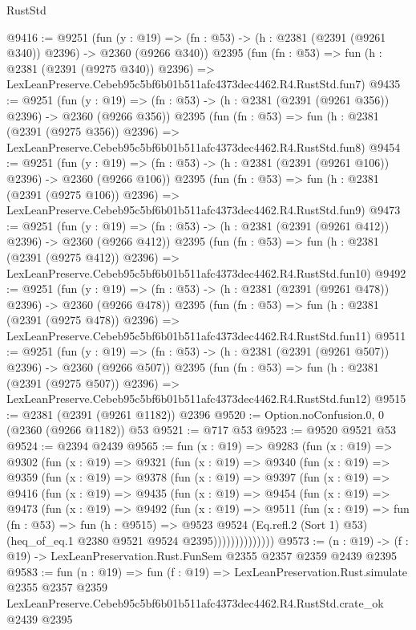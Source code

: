 \begin{lexlean}{RustStd}
\begin{coremodule}
@9416 := @9251
    (fun (y : @19) => (fn : @53) -> (h : @2381 (@2391 (@9261 @340)) @2396) -> @2360 (@9266 @340))
    @2395
    (fun (fn : @53) =>
    fun (h : @2381 (@2391 (@9275 @340)) @2396) =>
    LexLeanPreserve.Cebeb95c5bf6b01b511afc4373dec4462.R4.RustStd.fun7)
@9435 := @9251
    (fun (y : @19) => (fn : @53) -> (h : @2381 (@2391 (@9261 @356)) @2396) -> @2360 (@9266 @356))
    @2395
    (fun (fn : @53) =>
    fun (h : @2381 (@2391 (@9275 @356)) @2396) =>
    LexLeanPreserve.Cebeb95c5bf6b01b511afc4373dec4462.R4.RustStd.fun8)
@9454 := @9251
    (fun (y : @19) => (fn : @53) -> (h : @2381 (@2391 (@9261 @106)) @2396) -> @2360 (@9266 @106))
    @2395
    (fun (fn : @53) =>
    fun (h : @2381 (@2391 (@9275 @106)) @2396) =>
    LexLeanPreserve.Cebeb95c5bf6b01b511afc4373dec4462.R4.RustStd.fun9)
@9473 := @9251
    (fun (y : @19) => (fn : @53) -> (h : @2381 (@2391 (@9261 @412)) @2396) -> @2360 (@9266 @412))
    @2395
    (fun (fn : @53) =>
    fun (h : @2381 (@2391 (@9275 @412)) @2396) =>
    LexLeanPreserve.Cebeb95c5bf6b01b511afc4373dec4462.R4.RustStd.fun10)
@9492 := @9251
    (fun (y : @19) => (fn : @53) -> (h : @2381 (@2391 (@9261 @478)) @2396) -> @2360 (@9266 @478))
    @2395
    (fun (fn : @53) =>
    fun (h : @2381 (@2391 (@9275 @478)) @2396) =>
    LexLeanPreserve.Cebeb95c5bf6b01b511afc4373dec4462.R4.RustStd.fun11)
@9511 := @9251
    (fun (y : @19) => (fn : @53) -> (h : @2381 (@2391 (@9261 @507)) @2396) -> @2360 (@9266 @507))
    @2395
    (fun (fn : @53) =>
    fun (h : @2381 (@2391 (@9275 @507)) @2396) =>
    LexLeanPreserve.Cebeb95c5bf6b01b511afc4373dec4462.R4.RustStd.fun12)
@9515 := @2381 (@2391 (@9261 @1182)) @2396
@9520 := Option.noConfusion.{0, 0} (@2360 (@9266 @1182)) @53
@9521 := @717 @53
@9523 := @9520 @9521 @53
@9524 := @2394 @2439
@9565 := fun (x : @19) =>
  @9283
    (fun (x : @19) =>
    @9302
      (fun (x : @19) =>
      @9321
        (fun (x : @19) =>
        @9340
          (fun (x : @19) =>
          @9359
            (fun (x : @19) =>
            @9378
              (fun (x : @19) =>
              @9397
                (fun (x : @19) =>
                @9416
                  (fun (x : @19) =>
                  @9435
                    (fun (x : @19) =>
                    @9454
                      (fun (x : @19) =>
                      @9473
                        (fun (x : @19) =>
                        @9492
                          (fun (x : @19) =>
                          @9511
                            (fun (x : @19) =>
                            fun (fn : @53) =>
                            fun (h : @9515) =>
                            @9523
                              @9524
                              (Eq.refl.{2} (Sort 1) @53)
                              (heq_of_eq.{1} @2380 @9521 @9524 @2395))))))))))))))
@9573 := (n : @19) -> (f : @19) -> LexLeanPreservation.Rust.FunSem @2355 @2357 @2359 @2439 @2395
@9583 := fun (n : @19) =>
  fun (f : @19) =>
  LexLeanPreservation.Rust.simulate
    @2355
    @2357
    @2359
    LexLeanPreserve.Cebeb95c5bf6b01b511afc4373dec4462.R4.RustStd.crate_ok
    @2439
    @2395
\end{coremodule}
\end{lexlean}
